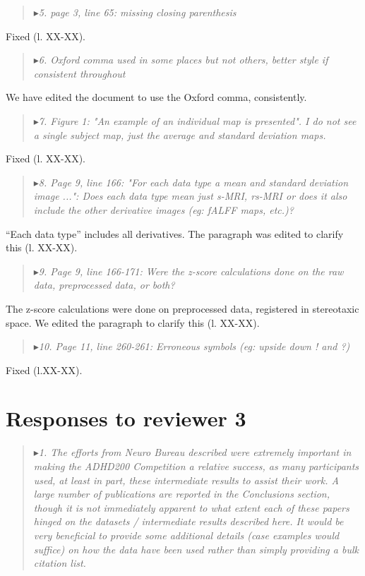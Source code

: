\documentclass[authoryear,3p]{elsarticle}
\begin{document}
\begin{quote}
$\blacktriangleright$\emph{5. page 3, line 65: missing closing parenthesis}
\end{quote}

Fixed (l. XX-XX).

\begin{quote}
$\blacktriangleright$\emph{6. Oxford comma used in some places but not others, better style if consistent throughout}
\end{quote}

We have edited the document to use the Oxford comma, consistently.

\begin{quote}
$\blacktriangleright$\emph{7. Figure 1: "An example of an individual map is presented". I do not see a single subject map, just the average and standard deviation maps.}
\end{quote}

Fixed (l. XX-XX). 

\begin{quote}
$\blacktriangleright$\emph{8.  Page 9, line 166: "For each data type a mean and standard deviation image ...": Does each data type mean just {s-MRI, rs-MRI} or does it also include the other derivative images (eg: fALFF maps, etc.)?}
\end{quote}

``Each data type'' includes all derivatives. The paragraph was edited to clarify this (l. XX-XX). 

\begin{quote}
$\blacktriangleright$\emph{9. Page 9, line 166-171: Were the z-score calculations done on the raw data, preprocessed data, or both?}
\end{quote}

The z-score calculations were done on preprocessed data, registered in stereotaxic space. We edited the paragraph to clarify this (l. XX-XX). 

\begin{quote}
$\blacktriangleright$\emph{10. Page 11, line 260-261: Erroneous symbols (eg: upside down ! and ?)}
\end{quote}

Fixed (l.XX-XX).

\section{Responses to reviewer 3}

\begin{quote}
$\blacktriangleright$\emph{1. The efforts from Neuro Bureau described were extremely important in making the ADHD200 Competition a relative success, as many participants used, at least in part, these intermediate results to assist their work. A large number of publications are reported in the Conclusions section, though it is not immediately apparent to what extent each of these papers hinged on the datasets / intermediate results described here.  It would be very beneficial to provide some additional details (case examples would suffice) on how the data have been used rather than simply providing a bulk citation list. 
}
\end{quote}
\end{document}
